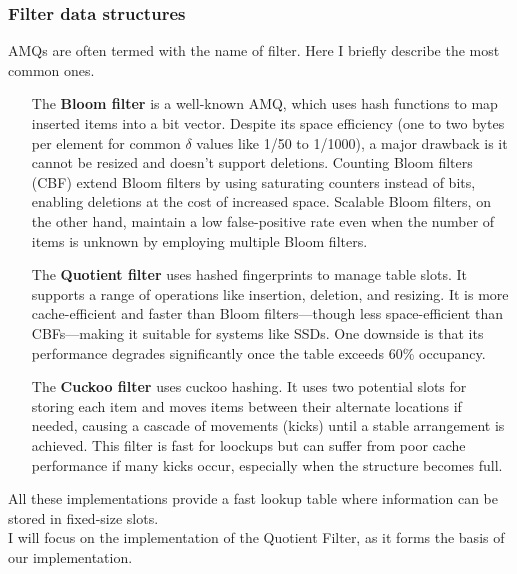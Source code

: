 \subsubsection{Filter data structures}
AMQs are often termed with the name of filter. Here I briefly describe the most common ones.
\begin{itemize}[leftmargin=1.8cm]
	\item[The \textbf{Bloom filter}] is a well-known AMQ, which uses hash functions to map inserted items into a bit vector. Despite its space efficiency (one to two bytes per element for common $\delta$ values like 1/50 to 1/1000), a major drawback is it cannot be resized and doesn't support deletions. Counting Bloom filters (CBF) extend Bloom filters by using saturating counters instead of bits, enabling deletions at the cost of increased space. Scalable Bloom filters, on the other hand, maintain a low false-positive rate even when the number of items is unknown by employing multiple Bloom filters.
	\item[The \textbf{Quotient filter}] uses hashed fingerprints to manage table slots. It supports a range of operations like insertion, deletion, and resizing. It is more cache-efficient and faster than Bloom filters—though less space-efficient than CBFs—making it suitable for systems like SSDs. One downside is that its performance degrades significantly once the table exceeds 60\% occupancy.
	\item[The \textbf{Cuckoo filter}] uses cuckoo hashing. It uses two potential slots for storing each item and moves items between their alternate locations if needed, causing a cascade of movements (kicks) until a stable arrangement is achieved. This filter is fast for loockups but can suffer from poor cache performance if many kicks occur, especially when the structure becomes full.
\end{itemize}
All these implementations provide a fast lookup table where information can be stored in fixed-size slots.\\
I will focus on the implementation of the Quotient Filter, as it forms the basis of our implementation.

